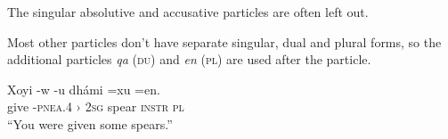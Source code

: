 \documentclass[11pt]{article} %
\begin{document}
The singular absolutive and accusative particles are often left out.

Most other particles don't have separate singular, dual and plural forms, so the additional particles \textit{qa} (\textsc{du}) and \textit{en} (\textsc{pl}) are used after the particle.

\begin{exe}  
  \ex
  \gll Xoyi  -w                 -u           dhámi =xu            =en.        \\
	   give  -\textsc{pnea.4 ›} \textsc{2sg} spear \textsc{instr} \textsc{pl} \\
  \glt ``You were given some spears.''
\end{exe}


\end{document}

